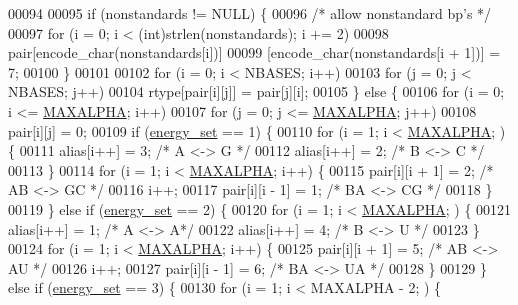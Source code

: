 \begin{DoxyCode}
00094 
00095     \textcolor{keywordflow}{if} (nonstandards != NULL) \{
00096       \textcolor{comment}{/* allow nonstandard bp's */}
00097       \textcolor{keywordflow}{for} (i = 0; i < (int)strlen(nonstandards); i += 2)
00098         pair[encode\_char(nonstandards[i])]
00099         [encode\_char(nonstandards[i + 1])] = 7;
00100     \}
00101 
00102     \textcolor{keywordflow}{for} (i = 0; i < NBASES; i++)
00103       \textcolor{keywordflow}{for} (j = 0; j < NBASES; j++)
00104         rtype[pair[i][j]] = pair[j][i];
00105   \} \textcolor{keywordflow}{else} \{
00106     \textcolor{keywordflow}{for} (i = 0; i <= \hyperlink{group__model__details_ga05a5ffe718aa431d97419a12fb082379}{MAXALPHA}; i++)
00107       \textcolor{keywordflow}{for} (j = 0; j <= \hyperlink{group__model__details_ga05a5ffe718aa431d97419a12fb082379}{MAXALPHA}; j++)
00108         pair[i][j] = 0;
00109     \textcolor{keywordflow}{if} (\hyperlink{group__model__details_gafb1ef1166da85092ae8a325e02dcae71}{energy\_set} == 1) \{
00110       \textcolor{keywordflow}{for} (i = 1; i < \hyperlink{group__model__details_ga05a5ffe718aa431d97419a12fb082379}{MAXALPHA}; ) \{
00111         alias[i++]  = 3;      \textcolor{comment}{/* A <-> G */}
00112         alias[i++]  = 2;      \textcolor{comment}{/* B <-> C */}
00113       \}
00114       \textcolor{keywordflow}{for} (i = 1; i < \hyperlink{group__model__details_ga05a5ffe718aa431d97419a12fb082379}{MAXALPHA}; i++) \{
00115         pair[i][i + 1] = 2;       \textcolor{comment}{/* AB <-> GC */}
00116         i++;
00117         pair[i][i - 1] = 1;       \textcolor{comment}{/* BA <-> CG */}
00118       \}
00119     \} \textcolor{keywordflow}{else} \textcolor{keywordflow}{if} (\hyperlink{group__model__details_gafb1ef1166da85092ae8a325e02dcae71}{energy\_set} == 2) \{
00120       \textcolor{keywordflow}{for} (i = 1; i < \hyperlink{group__model__details_ga05a5ffe718aa431d97419a12fb082379}{MAXALPHA}; ) \{
00121         alias[i++]  = 1;      \textcolor{comment}{/* A <-> A*/}
00122         alias[i++]  = 4;      \textcolor{comment}{/* B <-> U */}
00123       \}
00124       \textcolor{keywordflow}{for} (i = 1; i < \hyperlink{group__model__details_ga05a5ffe718aa431d97419a12fb082379}{MAXALPHA}; i++) \{
00125         pair[i][i + 1] = 5;       \textcolor{comment}{/* AB <-> AU */}
00126         i++;
00127         pair[i][i - 1] = 6;       \textcolor{comment}{/* BA <-> UA */}
00128       \}
00129     \} \textcolor{keywordflow}{else} \textcolor{keywordflow}{if} (\hyperlink{group__model__details_gafb1ef1166da85092ae8a325e02dcae71}{energy\_set} == 3) \{
00130       \textcolor{keywordflow}{for} (i = 1; i < MAXALPHA - 2; ) \{

\end{DoxyCode}
